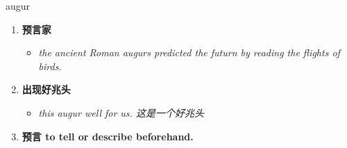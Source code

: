 
\begin{frame}
{\huge augur}
\begin{center}
\begin{enumerate}\Large
  \item \textbf{预言家}
  \begin{itemize}
    \item \em{\Large{the ancient Roman augurs predicted the futurn by reading the flights of birds.}}
  \end{itemize}
  \item \textbf{出现好兆头}
  \begin{itemize}
    \item \em{\Large{this augur well for us. 这是一个好兆头}}
  \end{itemize}
  \item \textbf{预言 to tell or describe beforehand.}
\end{enumerate}
\end{center}
\end{frame}
